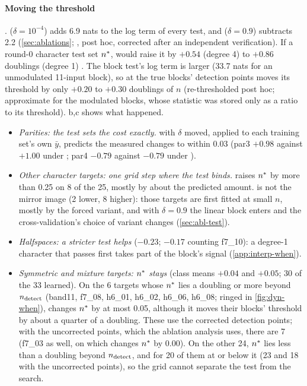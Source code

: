 \paragraph{Moving the threshold} .  ($\delta=10^{-4}$) adds 6.9 nats to the log term of every test, and  ($\delta=0.9$) subtracts 2.2 (\cref{sec:ablations}; , post hoc, corrected after an independent verification). If a round-0 character test set $n^{*}$,  would raise it by $+0.54$ (degree 4) to $+0.86$ doublings (degree 1) . The block test's log term is larger (33.7 nats for an unmodulated 11-input block), so at the true blocks' detection points  moves its threshold by only $+0.20$ to $+0.30$ doublings of $n$ (re-thresholded post hoc; approximate for the modulated blocks, whose statistic was stored only as a ratio to its threshold). b,c shows what happened.
\begin{itemize}
\item \emph{Parities: the test sets the cost exactly.}  with $\delta$ moved, applied to each training set's own $\bar y$, predicts the measured changes to within 0.03 (par3 $+0.98$ against $+1.00$ under ; par4 $-0.79$ against $-0.79$ under ).
\item \emph{Other character targets: one grid step where the test binds.}  raises $n^{*}$ by more than 0.25 on 8 of the 25, mostly by about the predicted amount.  is not the mirror image (2 lower, 8 higher): those targets are first fitted at small $n$, mostly by the forced variant, and with $\delta=0.9$ the linear block enters and the cross-validation's choice of variant changes (\cref{sec:abl-test}).
\item \emph{Halfspaces: a stricter test helps} ($-0.23$; $-0.17$ counting f7\_10): a degree-1 character that passes first takes part of the block's signal (\cref{app:interp-when}).
\item \emph{Symmetric and mixture targets: $n^{*}$ stays} (class means $+0.04$ and $+0.05$; 30 of the 33 learned). On the 6 targets whose $n^{*}$ lies a doubling or more beyond $n_{\rm detect}$ (band11, f7\_08, h6\_01, h6\_02, h6\_06, h6\_08; ringed in \cref{fig:dyn-when}),  changes $n^{*}$ by at most 0.05, although it moves their blocks' threshold by about a quarter of a doubling. These use the corrected detection points; with the uncorrected points, which the ablation analysis uses, there are 7 (f7\_03 as well, on which  changes $n^{*}$ by 0.00). On the other 24, $n^{*}$ lies less than a doubling beyond $n_{\rm detect}$, and for 20 of them at or below it (23 and 18 with the uncorrected points), so the grid cannot separate the test from the search.
\end{itemize}
